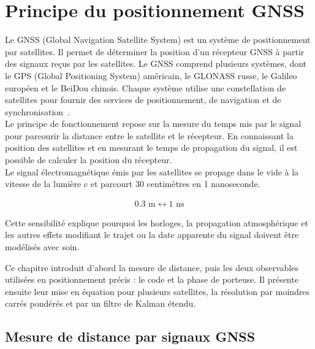 
\chapter{Principe du positionnement GNSS}
\label{principe_positionnement_gnss}
\thispagestyle{fancy}
\pagestyle{fancy}



Le GNSS (Global Navigation Satellite System) est un système de positionnement par satellites. 
Il permet de déterminer la position d'un récepteur GNSS à partir des signaux reçus par les satellites. 
Le GNSS comprend plusieurs systèmes, dont le GPS (Global Positioning System) américain, le GLONASS russe, le Galileo européen et le BeiDou chinois. 
Chaque système utilise une constellation de satellites pour fournir des services de positionnement, de navigation et de synchronisation~\cite[p.~591]{capderou2012}.\\
Le principe de fonctionnement repose sur la mesure du temps mis par le signal pour parcourir la distance entre le satellite et le récepteur. 
En connaissant la position des satellites et en mesurant le temps de propagation du signal, il est possible de calculer la position du récepteur.\\
Le signal électromagnétique émis par les satellites se propage dans le vide à la vitesse de la lumière c et parcourt 30 centimètres en 1 nanoseconde.

\begin{align}
0.3 \text{ m} \longleftrightarrow 1 \text{ ns}
\end{align}


Cette sensibilité explique pourquoi les horloges, la propagation
atmosphérique et les autres effets modifiant le trajet ou la date apparente du
signal doivent être modélisés avec soin.

Ce chapitre introduit d'abord la mesure de distance, puis les deux
observables utilisées en positionnement précis : le code et la phase de
porteuse. Il présente ensuite leur mise en équation pour plusieurs satellites,
la résolution par moindres carrés pondérés et par un filtre de Kalman étendu. 

\section{Mesure de distance par signaux GNSS}

